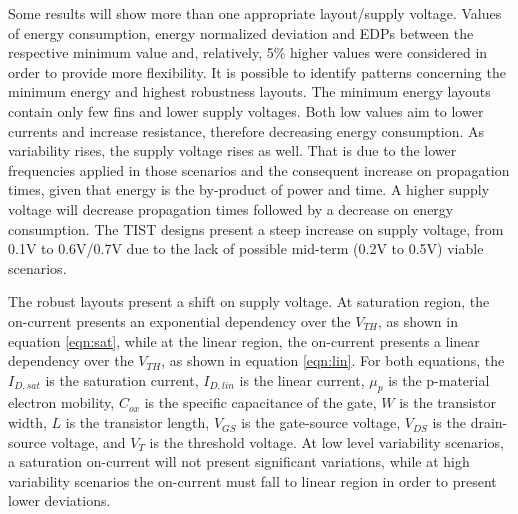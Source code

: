 \documentclass[pgmicro,mestrado,english]{iiufrgs}
\begin{document}
    Some results will show more than one appropriate layout/supply voltage. Values of energy consumption, energy normalized deviation and EDPs between the respective minimum value and, relatively, 5\% higher values were considered in order to provide more flexibility. It is possible to identify patterns concerning the minimum energy and highest robustness layouts. The minimum energy layouts contain only few fins and lower supply voltages. Both low values aim to lower currents and increase resistance, therefore decreasing energy consumption. As variability rises, the supply voltage rises as well. That is due to the lower frequencies applied in those scenarios and the consequent increase on propagation times, given that energy is the by-product of power and time. A higher supply voltage will decrease propagation times followed by a decrease on energy consumption. The TIST designs present a steep increase on supply voltage, from 0.1V to 0.6V/0.7V due to the lack of possible mid-term (0.2V to 0.5V) viable scenarios.

    The robust layouts present a shift on supply voltage. At saturation region, the on-current presents an exponential dependency over the $V_{TH}$, as shown in equation \ref{eqn:sat}, while at the linear region, the on-current presents a linear dependency over the $V_{TH}$, as shown in equation \ref{eqn:lin}. For both equations, the $I_{D,sat}$ is the saturation current, $I_{D,lin}$ is the linear current, $\mu_p$ is the p-material electron mobility, $C_{ox}$ is the specific capacitance of the gate, $W$ is the transistor width, $L$ is the transistor length, $V_{GS}$ is the gate-source voltage, $V_{DS}$ is the drain-source voltage, and $V_T$ is the threshold voltage. At low level variability scenarios, a saturation on-current will not present significant variations, while at high variability scenarios the on-current must fall to linear region in order to present lower deviations.
\end{document}
